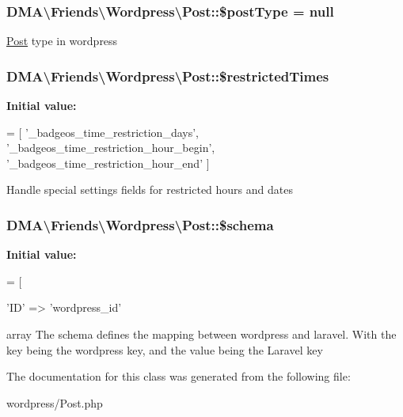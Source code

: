 \subsubsection[{\$post\+Type}]{\setlength{\rightskip}{0pt plus 5cm}D\+M\+A\textbackslash{}\+Friends\textbackslash{}\+Wordpress\textbackslash{}\+Post\+::\$post\+Type = null}\label{classDMA_1_1Friends_1_1Wordpress_1_1Post_a9b0ea251e8ba6b7161fc51ffa8fb72d8}
\hyperlink{classDMA_1_1Friends_1_1Wordpress_1_1Post}{Post} type in wordpress \hypertarget{classDMA_1_1Friends_1_1Wordpress_1_1Post_ac0b74792fa83b0a9dafda52eec451e50}{}
\subsubsection[{\$restricted\+Times}]{\setlength{\rightskip}{0pt plus 5cm}D\+M\+A\textbackslash{}\+Friends\textbackslash{}\+Wordpress\textbackslash{}\+Post\+::\$restricted\+Times\hspace{0.3cm}{\ttfamily [protected]}}\label{classDMA_1_1Friends_1_1Wordpress_1_1Post_ac0b74792fa83b0a9dafda52eec451e50}
{\bfseries Initial value\+:}
\begin{DoxyCode}
= [
        \textcolor{stringliteral}{'\_badgeos\_time\_restriction\_days'},
        \textcolor{stringliteral}{'\_badgeos\_time\_restriction\_hour\_begin'},
        \textcolor{stringliteral}{'\_badgeos\_time\_restriction\_hour\_end'}
    ]
\end{DoxyCode}
Handle special settings fields for restricted hours and dates \hypertarget{classDMA_1_1Friends_1_1Wordpress_1_1Post_a38fc35f2a6a04046e386cfd3f3564d89}{}
\subsubsection[{\$schema}]{\setlength{\rightskip}{0pt plus 5cm}D\+M\+A\textbackslash{}\+Friends\textbackslash{}\+Wordpress\textbackslash{}\+Post\+::\$schema}\label{classDMA_1_1Friends_1_1Wordpress_1_1Post_a38fc35f2a6a04046e386cfd3f3564d89}
{\bfseries Initial value\+:}
\begin{DoxyCode}
= [
        
        \textcolor{stringliteral}{'ID'}                                            => \textcolor{stringliteral}{'wordpress\_id'}
\end{DoxyCode}
array The schema defines the mapping between wordpress and laravel. With the key being the wordpress key, and the value being the Laravel key 

The documentation for this class was generated from the following file\+:\begin{DoxyCompactItemize}
\item 
wordpress/Post.\+php\end{DoxyCompactItemize}
